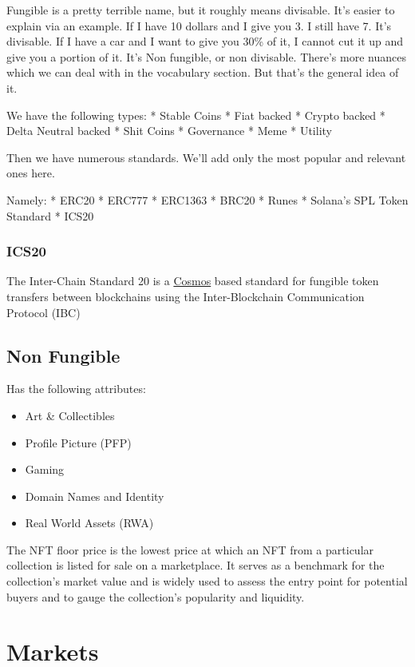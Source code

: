 \documentclass[
  letterpaper,
  DIV=11,
  numbers=noendperiod]{scrreprt}
\providecommand{\tightlist}{%
  \setlength{\itemsep}{0pt}\setlength{\parskip}{0pt}}\usepackage{longtable,booktabs,array}
\begin{document}
Fungible is a pretty terrible name, but it roughly means divisable. It's
easier to explain via an example. If I have 10 dollars and I give you 3.
I still have 7. It's divisable. If I have a car and I want to give you
30\% of it, I cannot cut it up and give you a portion of it. It's Non
fungible, or non divisable. There's more nuances which we can deal with
in the vocabulary section. But that's the general idea of it.

We have the following types: * Stable Coins * Fiat backed * Crypto
backed * Delta Neutral backed * Shit Coins * Governance * Meme * Utility

Then we have numerous standards. We'll add only the most popular and
relevant ones here.

Namely: * ERC20 * ERC777 * ERC1363 * BRC20 * Runes * Solana's SPL Token
Standard * ICS20

\subsubsection{ICS20}\label{ics20}

The Inter-Chain Standard 20 is a \hyperref[cosmos-hub]{Cosmos} based
standard for fungible token transfers between blockchains using the
Inter-Blockchain Communication Protocol (IBC)

\subsection{Non Fungible}\label{non-fungible}

Has the following attributes:

\begin{itemize}
\tightlist
\item
  Art \& Collectibles
\item
  Profile Picture (PFP)
\item
  Gaming
\item
  Domain Names and Identity
\item
  Real World Assets (RWA)
\end{itemize}

The NFT floor price is the lowest price at which an NFT from a
particular collection is listed for sale on a marketplace. It serves as
a benchmark for the collection's market value and is widely used to
assess the entry point for potential buyers and to gauge the
collection's popularity and liquidity.

\section{Markets}\label{markets}
\end{document}
